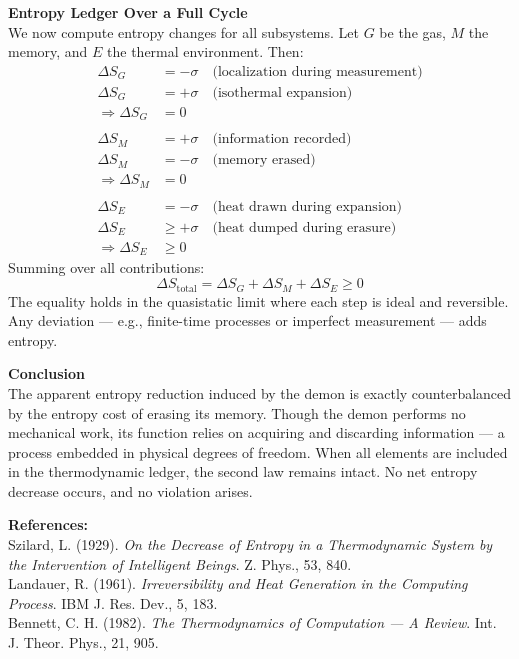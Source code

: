 \begin{technical}
\vspace{0.5em}
\noindent\textbf{Entropy Ledger Over a Full Cycle}\\[0.5em]
We now compute entropy changes for all subsystems. Let \( G \) be the gas, \( M \) the memory, and \( E \) the thermal environment. Then:
\begin{align*}
\Delta S_G &= -\sigma \quad \text{(localization during measurement)} \\
\Delta S_G &= +\sigma \quad \text{(isothermal expansion)} \\
\Rightarrow \Delta S_G &= 0 \\
\\[-1.5em]
\Delta S_M &= +\sigma \quad \text{(information recorded)} \\
\Delta S_M &= -\sigma \quad \text{(memory erased)} \\
\Rightarrow \Delta S_M &= 0 \\
\\[-1.5em]
\Delta S_E &= -\sigma \quad \text{(heat drawn during expansion)} \\
\Delta S_E &\geq +\sigma \quad \text{(heat dumped during erasure)} \\
\Rightarrow \Delta S_E &\geq 0
\end{align*}
Summing over all contributions:
\[
\Delta S_{\text{total}} = \Delta S_G + \Delta S_M + \Delta S_E \geq 0
\]
The equality holds in the quasistatic limit where each step is ideal and reversible. Any deviation — e.g., finite-time processes or imperfect measurement — adds entropy.

\vspace{0.5em}
\noindent\textbf{Conclusion}\\[0.5em]
The apparent entropy reduction induced by the demon is exactly counterbalanced by the entropy cost of erasing its memory. Though the demon performs no mechanical work, its function relies on acquiring and discarding information — a process embedded in physical degrees of freedom. When all elements are included in the thermodynamic ledger, the second law remains intact. No net entropy decrease occurs, and no violation arises.

\vspace{0.5em}
\noindent\textbf{References:}\\
Szilard, L. (1929). \textit{On the Decrease of Entropy in a Thermodynamic System by the Intervention of Intelligent Beings}. Z. Phys., 53, 840.\\
Landauer, R. (1961). \textit{Irreversibility and Heat Generation in the Computing Process}. IBM J. Res. Dev., 5, 183.\\
Bennett, C. H. (1982). \textit{The Thermodynamics of Computation — A Review}. Int. J. Theor. Phys., 21, 905.
\end{technical}
